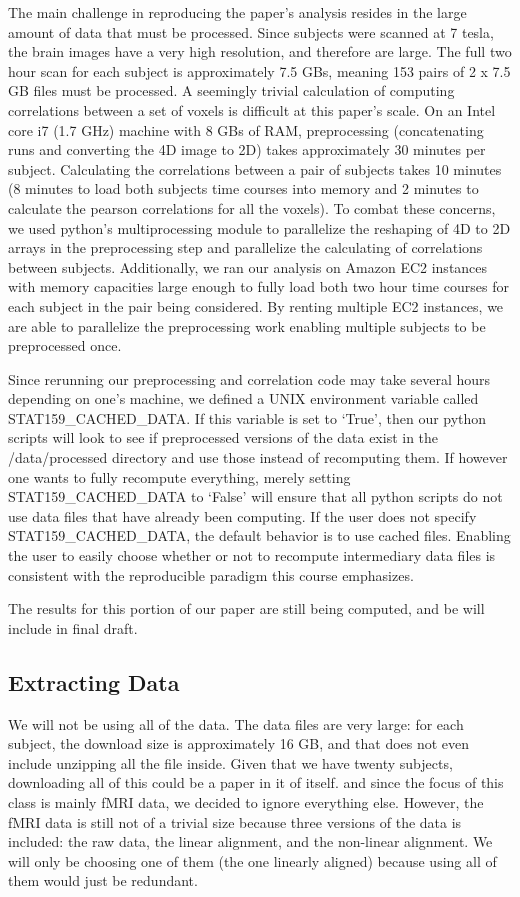 \documentclass[11pt]{article}
\begin{document}
The main challenge in reproducing the paper’s analysis resides in the large
amount of data that must be processed. Since subjects were scanned at 7 tesla,
the brain images have a very high resolution, and therefore are large. The
full two hour scan for each subject is approximately 7.5 GBs, meaning 153
pairs of 2 x 7.5 GB files must be processed. A seemingly trivial calculation
of computing correlations between a set of voxels is difficult at this paper’s
scale. On an Intel core i7 (1.7 GHz) machine with 8 GBs of RAM, preprocessing
(concatenating runs and converting the 4D image to 2D) takes approximately 30
minutes per subject. Calculating the correlations between a pair of subjects
takes 10 minutes (8 minutes to load both subjects time courses into memory and
2 minutes to calculate the pearson correlations for all the voxels).  To
combat these concerns, we used python’s multiprocessing module to parallelize
the reshaping of 4D to 2D arrays in the preprocessing step and parallelize the
calculating of correlations between subjects. Additionally, we ran our
analysis on Amazon EC2 instances with memory capacities large enough to fully
load both two hour time courses for each subject in the pair being considered.
By renting multiple EC2 instances, we are able to parallelize the
preprocessing work enabling multiple subjects to be preprocessed once.

Since rerunning our preprocessing and correlation code may take several hours
depending on one’s machine, we defined a UNIX environment variable called
STAT159\_CACHED\_DATA. If this variable is set to ‘True’, then our python
scripts will look to see if preprocessed versions of the data exist in the
/data/processed directory and use those instead of recomputing them. If
however one wants to fully recompute everything, merely setting
STAT159\_CACHED\_DATA to ‘False’ will ensure that all python scripts do not
use data files that have already been computing. If the user does not specify
STAT159\_CACHED\_DATA, the default behavior is to use cached files. Enabling
the user to easily choose whether or not to recompute intermediary data files
is consistent with the reproducible paradigm this course emphasizes.

The results for this portion of our paper are still being computed, and be will
include in final draft.

\subsection{Extracting Data} We will not be using all of the data. The data
files are very large: for each subject, the download size is approximately 16
GB, and that does not even include unzipping all the file inside. Given that
we have twenty subjects, downloading all of this could be a paper in it of
itself. and since the focus of this class is mainly fMRI data, we decided to
ignore everything else. However, the fMRI data is still not of a trivial size
because three versions of the data is included: the raw data, the linear
alignment, and the non-linear alignment. We will only be choosing one of them
(the one linearly aligned) because using all of them would just be redundant.
\end{document}

